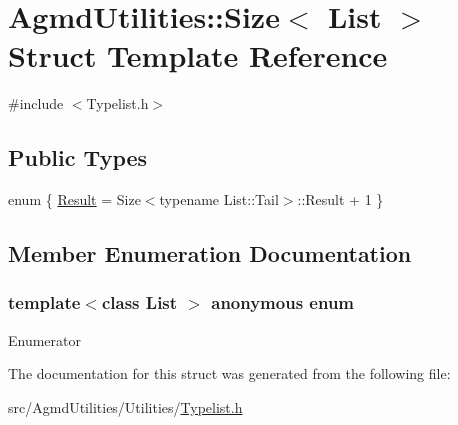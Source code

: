 \hypertarget{struct_agmd_utilities_1_1_size}{\section{Agmd\+Utilities\+:\+:Size$<$ List $>$ Struct Template Reference}
\label{struct_agmd_utilities_1_1_size}
}


{\ttfamily \#include $<$Typelist.\+h$>$}

\subsection*{Public Types}
\begin{DoxyCompactItemize}
\item 
enum \{ \hyperlink{struct_agmd_utilities_1_1_size_abc9b78dd718269d61270ae73cfceb887a5ce90841b93215de2cdff26bba471f2d}{Result} = Size$<$typename List\+:\+:Tail$>$\+:\+:Result + 1
 \}
\end{DoxyCompactItemize}


\subsection{Member Enumeration Documentation}
\hypertarget{struct_agmd_utilities_1_1_size_abc9b78dd718269d61270ae73cfceb887}{\subsubsection[{anonymous enum}]{\setlength{\rightskip}{0pt plus 5cm}template$<$class List $>$ anonymous enum}}\label{struct_agmd_utilities_1_1_size_abc9b78dd718269d61270ae73cfceb887}
\begin{Desc}
\item[Enumerator]\par
\begin{description}
\item[{\em 
\hypertarget{struct_agmd_utilities_1_1_size_abc9b78dd718269d61270ae73cfceb887a5ce90841b93215de2cdff26bba471f2d}{Result}\label{struct_agmd_utilities_1_1_size_abc9b78dd718269d61270ae73cfceb887a5ce90841b93215de2cdff26bba471f2d}
}]\end{description}
\end{Desc}


The documentation for this struct was generated from the following file\+:\begin{DoxyCompactItemize}
\item 
src/\+Agmd\+Utilities/\+Utilities/\hyperlink{_typelist_8h}{Typelist.\+h}\end{DoxyCompactItemize}
